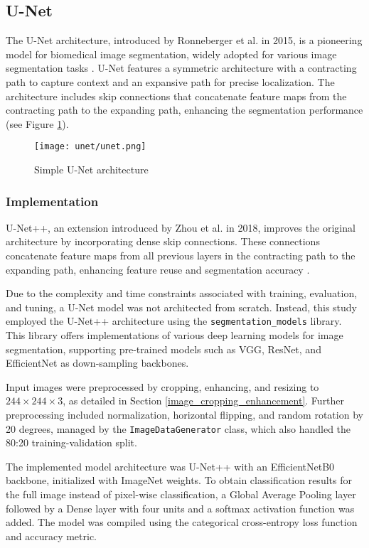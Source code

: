 \subsection{U-Net}\label{s:unet}

The U-Net architecture, introduced by Ronneberger et al. in 2015, is a pioneering model for biomedical image segmentation, widely adopted for various image segmentation tasks \cite{ronneberger_u-net_2015}. U-Net features a symmetric architecture with a contracting path to capture context and an expansive path for precise localization. The architecture includes skip connections that concatenate feature maps from the contracting path to the expanding path, enhancing the segmentation performance (see Figure \ref{f:unet}).

\begin{figure}[H] 
	\centering
	\texttt{[image: unet/unet.png]}
	\caption{Simple U-Net architecture}\label{f:unet}
\end{figure}

\subsubsection{Implementation}

U-Net++, an extension introduced by Zhou et al. in 2018, improves the original architecture by incorporating dense skip connections. These connections concatenate feature maps from all previous layers in the contracting path to the expanding path, enhancing feature reuse and segmentation accuracy \cite{zhou_unet_2018}.

Due to the complexity and time constraints associated with training, evaluation, and tuning, a U-Net model was not architected from scratch. Instead, this study employed the U-Net++ architecture using the \texttt{segmentation\_models} library. This library offers implementations of various deep learning models for image segmentation, supporting pre-trained models such as VGG, ResNet, and EfficientNet as down-sampling backbones.

Input images were preprocessed by cropping, enhancing, and resizing to $244 \times 244 \times 3$, as detailed in Section \ref{image_cropping_enhancement}. Further preprocessing included normalization, horizontal flipping, and random rotation by 20 degrees, managed by the \texttt{ImageDataGenerator} class, which also handled the 80:20 training-validation split.

The implemented model architecture was U-Net++ with an EfficientNetB0 backbone, initialized with ImageNet weights. To obtain classification results for the full image instead of pixel-wise classification, a Global Average Pooling layer followed by a Dense layer with four units and a softmax activation function was added. The model was compiled using the categorical cross-entropy loss function and accuracy metric.

